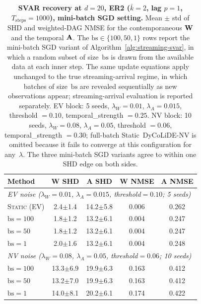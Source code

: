 \begin{table}[t]
\centering
\caption{\textbf{SVAR recovery at $d = 20$, ER2 ($\bar{k} = 2$, lag $p = 1$,
$T_\mathrm{steps} = 1000$), mini-batch SGD setting.} Mean $\pm$ std of
SHD and weighted-DAG NMSE for the contemporaneous ${\mathbf W}$ and the
temporal ${\mathbf A}$. The $\mathrm{bs}{\in}\{100,50,1\}$ rows report the
mini-batch SGD variant of Algorithm~\ref{alg:streaming-svar}, in which
a random subset of size~$\mathrm{bs}$ is drawn from the available data
at each inner step. The same update equations apply unchanged to the
true streaming-arrival regime, in which batches of size~$\mathrm{bs}$
are revealed sequentially as new observations appear; streaming-arrival
evaluation is reported separately. EV block: 5 seeds, $\lambda_W = 0.01$,
$\lambda_A = 0.015$, threshold $= 0.10$, temporal\_strength $= 0.25$.
NV block: 10 seeds, $\lambda_W = 0.08$, $\lambda_A = 0.05$, threshold
$= 0.06$, temporal\_strength $= 0.30$; full-batch Static~DyCoLiDE-NV is
omitted because it fails to converge at this configuration for
any~$\lambda$. The three mini-batch SGD variants agree to within one
SHD edge on both sides.}
\label{tab:svar-d20-er2}
\setlength{\tabcolsep}{8pt}
\begin{tabular}{l cccc}
\toprule
\textbf{Method}
  & \textbf{W SHD} & \textbf{A SHD}
  & \textbf{W NMSE} & \textbf{A NMSE} \\
\midrule
\multicolumn{5}{l}{\textit{EV noise ($\lambda_W{=}0.01$, $\lambda_A{=}0.015$, threshold${=}0.10$; 5 seeds)}} \\
\midrule
\textsc{Static} (EV) & 2.4$\pm$1.4 & 14.2$\pm$5.8 & 0.006 & 0.262 \\
$\mathrm{bs}{=}100$  & 1.8$\pm$1.2 & 13.2$\pm$6.1 & 0.004 & 0.247 \\
$\mathrm{bs}{=}50$   & 1.8$\pm$1.2 & 13.2$\pm$6.1 & 0.004 & 0.247 \\
$\mathrm{bs}{=}1$    & 2.0$\pm$1.6 & 13.2$\pm$6.1 & 0.004 & 0.248 \\
\midrule
\multicolumn{5}{l}{\textit{NV noise ($\lambda_W{=}0.08$, $\lambda_A{=}0.05$, threshold${=}0.06$; 10 seeds)}} \\
\midrule
$\mathrm{bs}{=}100$  & 13.3$\pm$6.9 & 19.9$\pm$6.3 & 0.163 & 0.412 \\
$\mathrm{bs}{=}50$   & 13.2$\pm$7.0 & 19.9$\pm$6.3 & 0.163 & 0.412 \\
$\mathrm{bs}{=}1$    & 14.0$\pm$8.1 & 20.2$\pm$6.1 & 0.174 & 0.422 \\
\bottomrule
\end{tabular}
\end{table}
